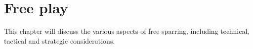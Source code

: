 \chapter{Free play}\label{ch:sparring}

This chapter will discuss the various aspects of free sparring, including technical, tactical and strategic considerations.